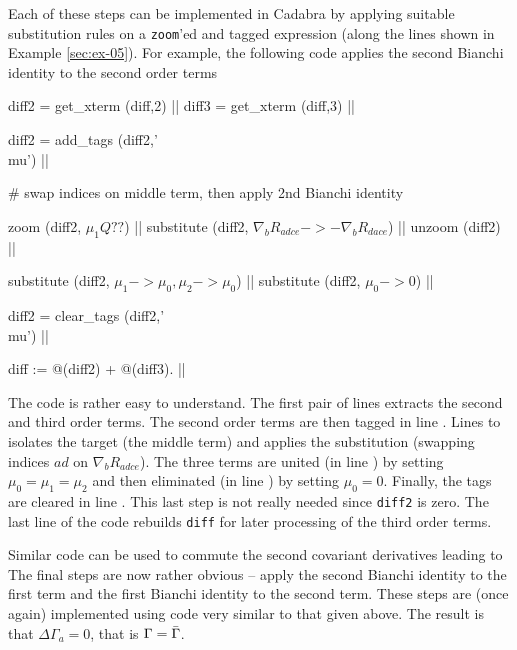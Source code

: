 \documentclass[a4paper,12pt]{article}
\numberwithin{equation}{section}%
\begin{document}
Each of these steps can be implemented in Cadabra by applying suitable substitution rules on
a \verb|zoom|'ed and tagged expression (along the lines shown in Example \ref{sec:ex-05}).
For example, the following code applies the second Bianchi identity to the second order terms
\begin{cadabra}
   diff2 = get_xterm (diff,2)            ||
   diff3 = get_xterm (diff,3)            ||

   diff2 = add_tags (diff2,'\\mu')       ||

   # swap indices on middle term, then apply 2nd Bianchi identity

   zoom       (diff2, $\mu_{1} Q??$)                                           ||
   substitute (diff2, $\nabla_{b}{R_{a d c e}} -> - \nabla_{b}{R_{d a c e}}$)  ||
   unzoom     (diff2)                                                          ||

   substitute (diff2, $\mu_{1} -> \mu_{0}, \mu_{2} -> \mu_{0}$)    ||
   substitute (diff2, $\mu_{0} -> 0$)                              ||

   diff2 = clear_tags (diff2,'\\mu')                               ||

   diff := @(diff2) + @(diff3).                                    ||
\end{cadabra}
The code is rather easy to understand. The first pair of lines extracts the second and third
order terms. The second order terms are then tagged in line . Lines
 to  isolates the target (the middle term) and applies
the substitution (swapping indices ${ad}$ on $\nabla_{b}R_{adce}$). The three terms are
united (in line ) by setting $\mu_{0}=\mu_{1}=\mu_{2}$ and then eliminated
(in line ) by setting $\mu_0 = 0$. Finally, the tags are cleared in line
. This last step is not really needed since \verb|diff2| is zero. The last
line of the code rebuilds \verb|diff| for later processing of the third order terms.

Similar code can be used to commute the second covariant derivatives leading to
The final steps are now rather obvious -- apply the second Bianchi identity to the first
term and the first Bianchi identity to the second term. These steps are (once again)
implemented using code very similar to that given above. The result is that
$\Delta\Gamma_{a}=0$, that is $\Gamma={\bar{\Gamma}}$.
\end{document}
